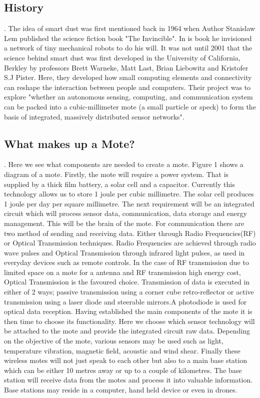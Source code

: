 \documentclass[article]{IEEEtran}
\begin{document}
\subsection*{History}.\newline
The idea of smart dust was first mentioned back in 1964 when Author Stanislaw Lem published the science fiction book "The Invincible". In is book he invisioned a network of tiny mechanical robots to do his will\cite{leminvincible}. It was not until 2001 that the science behind smart dust was first developed in the University of California, Berkley by professors Brett Warneke, Matt Last, Brian Liebowitz and Kristofer S.J Pister. 
Here, they developed how small computing elements and connectivity can reshape the interaction between people and computers. Their project was to explore "whether an autonomous sensing, computing, and communication system can be packed into a cubic-millimeter mote (a small particle or speck) to form the basis of integrated, massively distributed sensor networks"\cite{Mili}. 

\subsection*{What makes up a Mote?}.\newline
Here we see what components are needed to create a mote. 
Figure 1 shows a diagram of a mote. Firstly, the mote will require a power system. That is supplied by a thick film battery, a solar cell and a capacitor. Currently this technology allows us to store 1 joule per cubic millimetre. The solar cell produces 1 joule per day per square millimetre. 
The next requirement will be an integrated circuit which will process sensor data, communication, data storage and energy management. This will be the brain of the mote. 
For communication there are two method of sending and receiving data. Either through Radio Frequencies(RF) or Optical Transmission techniques. Radio Frequencies are achieved through radio wave pulses and Optical Transmission through infrared light pulses, as used in everyday devices such as remote controls. In the case of RF transmission due to limited space on a mote for a antenna and RF transmission high energy cost, Optical Transmission is the favoured choice. Transmission of data is executed in either of 2 ways; passive transmission using a corner cube retro-reflector or active transmission using a laser diode and steerable mirrors.A photodiode is used for optical data reception.
Having established the main components of the mote it is then time to choose its functionality. Here we choose which sensor technology will be attached to the mote and provide the integrated circuit raw data. Depending on the objective of the mote, various sensors may be used such as light, temperature vibration, magnetic field, acoustic and wind shear.
Finally these wireless motes will not just speak to each other but also to a main base station which can be either 10 metres away or up to a couple of kilometres.  The base station will receive data from the motes and process it into valuable information. Base stations may reside in a computer, hand held device or even in drones\cite{Mili}.
\end{document}
